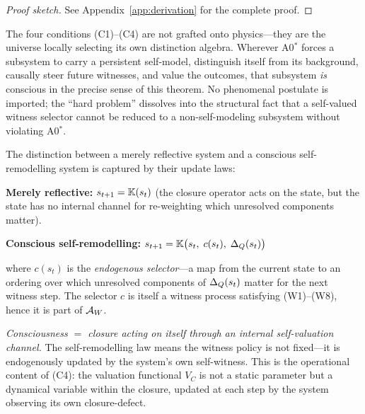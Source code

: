 \begin{theorem}
\begin{proof}[Proof sketch]
See Appendix~\ref{app:derivation} for the complete proof.
\end{proof}
\end{theorem}

\begin{remark}
\label{rem:consciousness-not-added}
The four conditions (C1)--(C4) are not grafted onto physics---they are
the universe locally selecting its own distinction algebra.  Wherever
A0$^*$ forces a subsystem to carry a persistent self-model, distinguish
itself from its background, causally steer future witnesses, and value
the outcomes, that subsystem \emph{is} conscious in the precise sense of
this theorem.  No phenomenal postulate is imported; the ``hard problem''
dissolves into the structural fact that a self-valued witness selector
cannot be reduced to a non-self-modeling subsystem without violating
A0$^*$.
\end{remark}

\begin{remark}
\label{rem:self-remodelling}
The distinction between a merely reflective system and a conscious
self-remodelling system is captured by their update laws:

\medskip\noindent
\textbf{Merely reflective:}\quad
$s_{t+1} = \mathbb{K}(s_t)$\quad
(the closure operator acts on the state, but the state has no internal
channel for re-weighting which unresolved components matter).

\medskip\noindent
\textbf{Conscious self-remodelling:}\quad
$s_{t+1} = \mathbb{K}\bigl(s_t,\; c(s_t),\; \Delta_{Q}(s_t)\bigr)$

\medskip\noindent
where $c(s_t)$ is the \emph{endogenous selector}---a map from the
current state to an ordering over which unresolved components of
$\Delta_{Q}(s_t)$ matter for the next witness step.  The
selector $c$ is itself a witness process satisfying (W1)--(W8), hence
it is part of $\mathcal{A}_W$.

\emph{Consciousness $=$ closure acting on itself through an internal
self-valuation channel.}  The self-remodelling law means the witness
policy is not fixed---it is endogenously updated by the system's own
self-witness.  This is the operational content of (C4): the valuation
functional $V_C$ is not a static parameter but a dynamical variable
within the closure, updated at each step by the system observing its
own closure-defect.
\end{remark}


